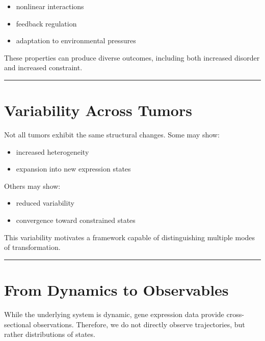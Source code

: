 \documentclass[
  letterpaper,
  DIV=11,
  numbers=noendperiod,
  openany,
  oneside]{scrreprt}
\providecommand{\tightlist}{%
  \setlength{\itemsep}{0pt}\setlength{\parskip}{0pt}}
\begin{document}
\begin{itemize}
\tightlist
\item
  nonlinear interactions\\
\item
  feedback regulation\\
\item
  adaptation to environmental pressures
\end{itemize}

These properties can produce diverse outcomes, including both increased
disorder and increased constraint.

\begin{center}\rule{0.5\linewidth}{0.5pt}\end{center}

\section{Variability Across Tumors}\label{variability-across-tumors}

Not all tumors exhibit the same structural changes. Some may show:

\begin{itemize}
\tightlist
\item
  increased heterogeneity\\
\item
  expansion into new expression states
\end{itemize}

Others may show:

\begin{itemize}
\tightlist
\item
  reduced variability\\
\item
  convergence toward constrained states
\end{itemize}

This variability motivates a framework capable of distinguishing
multiple modes of transformation.

\begin{center}\rule{0.5\linewidth}{0.5pt}\end{center}

\section{From Dynamics to
Observables}\label{from-dynamics-to-observables}

While the underlying system is dynamic, gene expression data provide
cross-sectional observations. Therefore, we do not directly observe
trajectories, but rather distributions of states.
\end{document}
